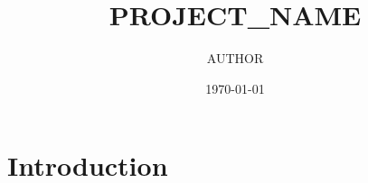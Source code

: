 \documentclass{amsart}
\title{PROJECT_NAME}
\author{AUTHOR}
\date{\today}
\begin{document}
\maketitle

\begin{abstract}
\end{abstract}

\section{Introduction}



\end{document}
